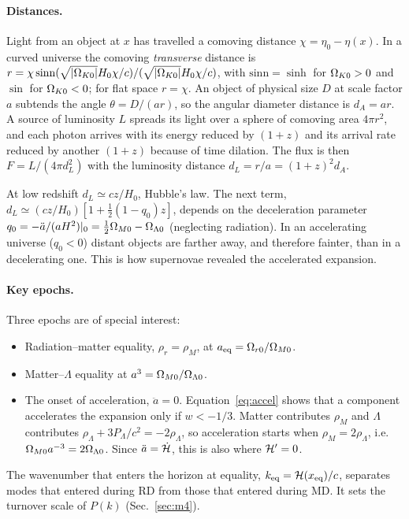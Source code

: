 \paragraph*{Distances.} Light from an object at $x$ has travelled a comoving distance $\chi=\eta_0-\eta(x)$. In a
curved universe the comoving \emph{transverse} distance is $r=\chi\,\mathrm{sinn}(\sqrt{|\Omega_{K0}|}H_0\chi/c)/
(\sqrt{|\Omega_{K0}|}H_0\chi/c)$, with $\mathrm{sinn}=\sinh$ for $\Omega_{K0}>0$ and $\sin$ for $\Omega_{K0}<0$; for flat space
$r=\chi$. An object of physical size $D$ at scale factor $a$ subtends the angle $\theta=D/(ar)$, so the angular
diameter distance is $d_A=ar$. A source of luminosity $L$ spreads its light over a sphere of comoving area $4\pi r^2$,
and each photon arrives with its energy reduced by $(1+z)$ and its arrival rate reduced by another $(1+z)$ because of
time dilation. The flux is then $F=L/(4\pi d_L^2)$ with the luminosity distance $d_L=r/a=(1+z)^2d_A$.

At low redshift $d_L\simeq cz/H_0$, Hubble's law. The next term,
$d_L\simeq(cz/H_0)[1+\tfrac12(1-q_0)z]$, depends on the deceleration parameter $q_0=-\ddot a/(aH^2)|_0=
\tfrac12\Omega_{M0}-\Omega_{\Lambda0}$ (neglecting radiation). In an accelerating universe ($q_0<0$) distant objects are
farther away, and therefore fainter, than in a decelerating one. This is how supernovae revealed the accelerated
expansion.

\paragraph*{Key epochs.} Three epochs are of special interest:
\begin{itemize}
\item Radiation--matter equality, $\rho_r=\rho_M$, at $a_{\rm eq}=\Omega_{r0}/\Omega_{M0}$.
\item Matter--$\Lambda$ equality at $a^3=\Omega_{M0}/\Omega_{\Lambda0}$.
\item The onset of acceleration, $\ddot a=0$. Equation~\eqref{eq:accel} shows that a component accelerates the
      expansion only if $w<-1/3$. Matter contributes $\rho_M$ and $\Lambda$ contributes $\rho_\Lambda+3P_\Lambda/c^2=
      -2\rho_\Lambda$, so acceleration starts when $\rho_M=2\rho_\Lambda$, i.e.\ $\Omega_{M0}a^{-3}=2\Omega_{\Lambda0}$.
      Since $\ddot a=\dot{\mathcal{H}}$, this is also where $\mathcal{H}'=0$.
\end{itemize}
The wavenumber that enters the horizon at equality, $k_{\rm eq}=\mathcal{H}(x_{\rm eq})/c$, separates modes that entered
during RD from those that entered during MD. It sets the turnover scale of $P(k)$ (Sec.~\ref{sec:m4}).

